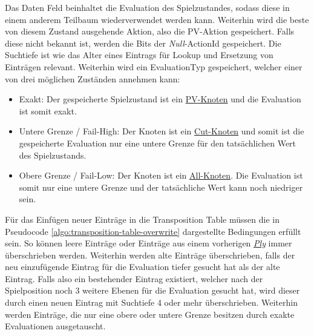 Das Daten Feld beinhaltet die Evaluation des Spielzustandes, sodass diese in einem anderem Teilbaum wiederverwendet werden kann. Weiterhin wird die beste von diesem Zustand ausgehende Aktion, also die \ac{PV}-Aktion gespeichert. Falls diese nicht bekannt ist, werden die Bits der \emph{Null}-ActionId gespeichert. Die Suchtiefe ist wie das Alter eines Eintrags für Lookup und Ersetzung von Einträgen relevant. Weiterhin wird ein EvaluationTyp gespeichert, welcher einer von drei möglichen Zuständen annehmen kann:

\begin{itemize}
    \item Exakt: Der gespeicherte Spielzustand ist ein \hyperref[text:pv-node]{\acs{PV}-Knoten} und die Evaluation ist somit exakt.
    \item Untere Grenze / Fail-High: Der Knoten ist ein \hyperref[text:cut-node]{Cut-Knoten} und somit ist die gespeicherte Evaluation nur eine untere Grenze für den tatsächlichen Wert des Spielzustands.
    \item Obere Grenze / Fail-Low: Der Knoten ist ein \hyperref[text:all-node]{All-Knoten}. Die Evaluation ist somit nur eine untere Grenze und der tatsächliche Wert kann noch niedriger sein.
\end{itemize}

Für das Einfügen neuer Einträge in die Transposition Table müssen die in Pseudocode \ref{algo:transposition-table-overwrite} dargestellte Bedingungen erfüllt sein. So können leere Einträge oder Einträge aus einem vorherigen \hyperref[text:ply]{\emph{Ply}} immer überschrieben werden. Weiterhin werden alte Einträge überschrieben, falls der neu einzufügende Eintrag für die Evaluation tiefer gesucht hat als der alte Eintrag. Falls also ein bestehender Eintrag existiert, welcher nach der Spielposition noch 3 weitere Ebenen für die Evaluation gesucht hat, wird dieser durch einen neuen Eintrag mit Suchtiefe 4 oder mehr überschrieben. Weiterhin werden Einträge, die nur eine obere oder untere Grenze besitzen durch exakte Evaluationen ausgetauscht.

\pagebreak


